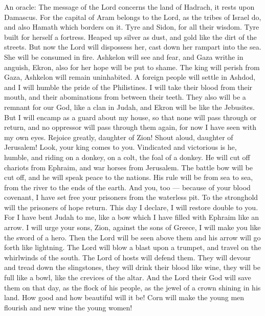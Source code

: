  An oracle: The message of the Lord concerns the land of
Hadrach, it rests upon Damascus. For the capital of Aram belongs to the
Lord, as the tribes of Israel do,  and also Hamath which
borders on it. Tyre and Sidon, for all their wisdom.  Tyre
built for herself a fortress. Heaped up silver as dust, and gold like
the dirt of the streets.  But now the Lord will dispossess
her, cast down her rampart into the sea. She will be consumed in fire.
 Ashkelon will see and fear, and Gaza writhe in anguish,
Ekron, also for her hope will be put to shame. The king will perish from
Gaza, Ashkelon will remain uninhabited.  A foreign people
will settle in Ashdod, and I will humble the pride of the Philistines.
 I will take their blood from their mouth, and their
abominations from between their teeth. They also will be a remnant for
our God, like a clan in Judah, and Ekron will be like the Jebusites.
 But I will encamp as a guard about my house, so that none
will pass through or return, and no oppressor will pass through them
again, for now I have seen with my own eyes.  Rejoice
greatly, daughter of Zion! Shout aloud, daughter of Jerusalem! Look,
your king comes to you. Vindicated and victorious is he, humble, and
riding on a donkey, on a colt, the foal of a donkey.  He
will cut off chariots from Ephraim, and war horses from Jerusalem. The
battle bow will be cut off, and he will speak peace to the nations. His
rule will be from sea to sea, from the river to the ends of the earth.
 And you, too --- because of your blood covenant, I have
set free your prisoners from the waterless pit.  To the
stronghold will the prisoners of hope return. This day I declare, I will
restore double to you.  For I have bent Judah to me, like a
bow which I have filled with Ephraim like an arrow. I will urge your
sons, Zion, against the sons of Greece, I will make you like the sword
of a hero.  Then the Lord will be seen above them and his
arrow will go forth like lightning. The Lord will blow a blast upon a
trumpet, and travel on the whirlwinds of the south.  The
Lord of hosts will defend them. They will devour and tread down the
slingstones, they will drink their blood like wine, they will be full
like a bowl, like the crevices of the altar.  And the Lord
their God will save them on that day, as the flock of his people, as the
jewel of a crown shining in his land.  How good and how
beautiful will it be! Corn will make the young men flourish and new wine
the young women!

